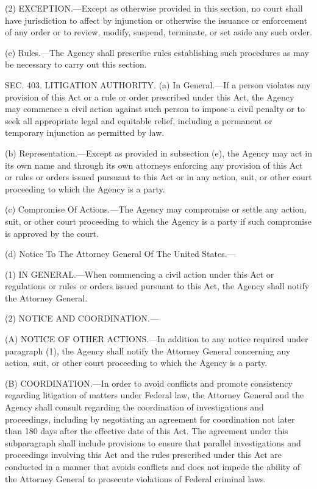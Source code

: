 (2) EXCEPTION.—Except as otherwise provided in this section, no court shall have jurisdiction to affect by injunction or otherwise the issuance or enforcement of any order or to review, modify, suspend, terminate, or set aside any such order.

(e) Rules.—The Agency shall prescribe rules establishing such procedures as may be necessary to carry out this section.


SEC. 403. LITIGATION AUTHORITY.
(a) In General.—If a person violates any provision of this Act or a rule or order prescribed under this Act, the Agency may commence a civil action against such person to impose a civil penalty or to seek all appropriate legal and equitable relief, including a permanent or temporary injunction as permitted by law.

(b) Representation.—Except as provided in subsection (e), the Agency may act in its own name and through its own attorneys enforcing any provision of this Act or rules or orders issued pursuant to this Act or in any action, suit, or other court proceeding to which the Agency is a party.

(c) Compromise Of Actions.—The Agency may compromise or settle any action, suit, or other court proceeding to which the Agency is a party if such compromise is approved by the court.

(d) Notice To The Attorney General Of The United States.—

(1) IN GENERAL.—When commencing a civil action under this Act or regulations or rules or orders issued pursuant to this Act, the Agency shall notify the Attorney General.

(2) NOTICE AND COORDINATION.—

(A) NOTICE OF OTHER ACTIONS.—In addition to any notice required under paragraph (1), the Agency shall notify the Attorney General concerning any action, suit, or other court proceeding to which the Agency is a party.

(B) COORDINATION.—In order to avoid conflicts and promote consistency regarding litigation of matters under Federal law, the Attorney General and the Agency shall consult regarding the coordination of investigations and proceedings, including by negotiating an agreement for coordination not later than 180 days after the effective date of this Act. The agreement under this subparagraph shall include provisions to ensure that parallel investigations and proceedings involving this Act and the rules prescribed under this Act are conducted in a manner that avoids conflicts and does not impede the ability of the Attorney General to prosecute violations of Federal criminal laws.

